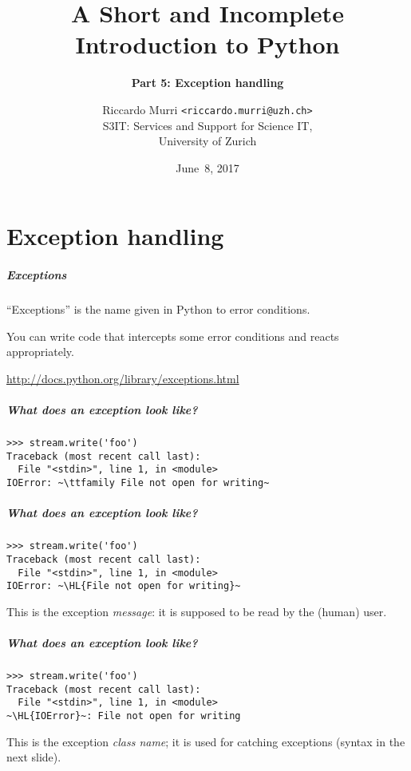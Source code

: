 \documentclass[english,serif,mathserif,xcolor=pdftex,dvipsnames,table]{beamer}
\title[5. Exception handling]{%
  A Short and Incomplete Introduction to Python
}
\subtitle{\bfseries Part 5: Exception handling}
\author[R.~Murri]{%
  Riccardo Murri \texttt{<riccardo.murri@uzh.ch>}
  \\
  S3IT: Services and Support for Science IT,
  \\
  University of Zurich
}
\date{June~8, 2017}
\begin{document}
\maketitle


\part{Exception handling}

\begin{frame}[fragile]
  \frametitle{Exceptions}

  ``Exceptions'' is the name given in Python to error conditions.

  \+
  You can write code that intercepts some error conditions and
  reacts appropriately.

  \+
  \begin{seealso}
    \url{http://docs.python.org/library/exceptions.html}
  \end{seealso}
\end{frame}


\begin{frame}[fragile]
  \frametitle{What does an exception look like?}
\begin{lstlisting}
>>> stream.write('foo')
Traceback (most recent call last):
  File "<stdin>", line 1, in <module>
IOError: ~\ttfamily File not open for writing~
\end{lstlisting}
\end{frame}


\begin{frame}[fragile]
  \frametitle{What does an exception look like?}
\begin{lstlisting}
>>> stream.write('foo')
Traceback (most recent call last):
  File "<stdin>", line 1, in <module>
IOError: ~\HL{File not open for writing}~
\end{lstlisting}

  \+
  This is the exception \emph{message}: it is supposed to be read
  by the (human) user.
\end{frame}


\begin{frame}[fragile]
  \frametitle{What does an exception look like?}
\begin{lstlisting}
>>> stream.write('foo')
Traceback (most recent call last):
  File "<stdin>", line 1, in <module>
~\HL{IOError}~: File not open for writing
\end{lstlisting}

  \+ This is the exception \emph{class name}; it is used for catching
  exceptions (syntax in the next slide).
\end{frame}
\end{document}
